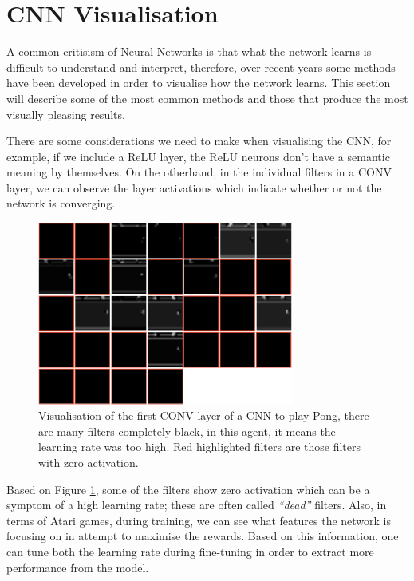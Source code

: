 \newpage

\section{CNN Visualisation}
\label{bg:sec:cnn-vis}
A common critisism of Neural Networks is that what the network learns is difficult to understand and interpret, therefore, over recent years some methods have been developed in order to visualise how the network learns. This section will describe some of the most common methods and those that produce the most visually pleasing results.

There are some considerations we need to make when visualising the CNN, for example, if we include a ReLU layer, the ReLU neurons don't have a semantic meaning by themselves. On the otherhand, in the individual filters in a CONV layer, we can observe the layer activations which indicate whether or not the network is converging.

\begin{figure}[ht!]
	\centering
	\includegraphics[width=0.75\textwidth]{chapters/chapter2/images/viz.png}
	\caption[Visualisation of the filters from the first layer of a CNN used to play Pong]{Visualisation of the first CONV layer of a CNN to play Pong, there are many filters completely black, in this agent, it means the learning rate was too high. Red highlighted filters are those filters with zero activation.
		\label{fig:cnn-viz-activ}
	}
\end{figure}

Based on Figure \ref{fig:cnn-viz-activ}, some of the filters show zero activation which can be a symptom of a high learning rate; these are often called \textit{``dead''} filters. Also, in terms of Atari games, during training, we can see what features the network is focusing on in attempt to maximise the rewards. Based on this information, one can tune both the learning rate during fine-tuning in order to extract more performance from the model.

